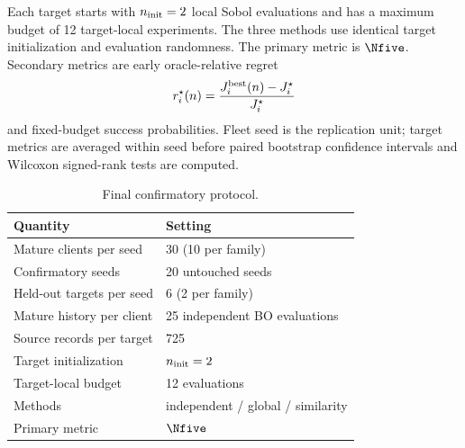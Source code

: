 Each target starts with $n_{\rm init}=2$ local Sobol evaluations and has a maximum budget of 12 target-local experiments. The three methods use identical target initialization and evaluation randomness. The primary metric is $\Nfive$. Secondary metrics are early oracle-relative regret
\begin{equation}
 r_i^\star(n)=\frac{J_i^{\rm best}(n)-J_i^\star}{J_i^\star}
\end{equation}
and fixed-budget success probabilities. Fleet seed is the replication unit; target metrics are averaged within seed before paired bootstrap confidence intervals and Wilcoxon signed-rank tests are computed.

\begin{table}[t]
\centering
\caption{Final confirmatory protocol.}
\label{tab:protocol}
\scriptsize
\begin{tabular}{@{}ll@{}}
\toprule
Quantity & Setting\\
\midrule
Mature clients per seed & 30 (10 per family)\\
Confirmatory seeds & 20 untouched seeds\\
Held-out targets per seed & 6 (2 per family)\\
Mature history per client & 25 independent BO evaluations\\
Source records per target & 725\\
Target initialization & $n_{\rm init}=2$\\
Target-local budget & 12 evaluations\\
Methods & independent / global / similarity\\
Primary metric & $\Nfive$\\
\bottomrule
\end{tabular}
\end{table}

